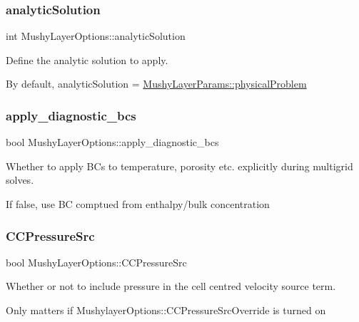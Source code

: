 \subsubsection{\texorpdfstring{analytic\+Solution}{analyticSolution}}
{\footnotesize\ttfamily int Mushy\+Layer\+Options\+::analytic\+Solution}



Define the analytic solution to apply. 

By default, analytic\+Solution = \hyperlink{class_mushy_layer_params_af648dea6d76d52f10124c33f6817be2b}{Mushy\+Layer\+Params\+::physical\+Problem} \mbox{\label{struct_mushy_layer_options_a078a1ef21c19a8b1eb903f0c5c90ad4f}} 
\subsubsection{\texorpdfstring{apply\+\_\+diagnostic\+\_\+bcs}{apply\_diagnostic\_bcs}}
{\footnotesize\ttfamily bool Mushy\+Layer\+Options\+::apply\+\_\+diagnostic\+\_\+bcs}



Whether to apply B\+Cs to temperature, porosity etc. explicitly during multigrid solves. 

If false, use BC comptued from enthalpy/bulk concentration \mbox{\label{struct_mushy_layer_options_ab873fea567aee972e6604297009cd0be}} 
\subsubsection{\texorpdfstring{C\+C\+Pressure\+Src}{CCPressureSrc}}
{\footnotesize\ttfamily bool Mushy\+Layer\+Options\+::\+C\+C\+Pressure\+Src}



Whether or not to include pressure in the cell centred velocity source term. 

Only matters if Mushylayer\+Options\+::\+C\+C\+Pressure\+Src\+Override is turned on \mbox{\label{struct_mushy_layer_options_af54eaaeb12b789f2f5cc3b47867584ce}} 
